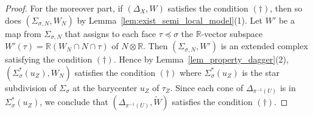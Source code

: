 \documentclass[12pt,reqno]{amsart}
\theoremstyle{definition}
\newcommand\bR{{\mathbb R}}
\begin{document}
\begin{proof}
For the moreover part, if $(\Delta_X,W)$ satisfies the condition $(\dagger)$, then so does $(\Sigma_{\sigma,N},W_N)$ by Lemma~\ref{lem:exist_semi_local_model}(1). 
Let $W'$ be a map from $\Sigma_{\sigma,N}$ that assigns to each face $\tau\preceq\sigma$ the $\bR$-vector subspace $W'(\tau)=\bR(W_N\cap N\cap \tau)$ of $N\otimes\bR$. 
Then $(\Sigma_{\sigma,N},W')$ is an extended complex satisfying the condition $(\dagger)$. 
Hence by Lemma~\ref{lem_property_dagger}(2), $(\Sigma_\sigma^*(u_Z),W_N)$ satisfies the condition $(\dagger)$ where $\Sigma_\sigma^*(u_Z)$ is the star subdivision of $\Sigma_\sigma$ at the barycenter $u_Z$ of $\tau_Z$. Since each cone of $\Delta_{\pi^{-1}(U)}$ is in $\Sigma_\sigma^*(u_Z)$, we conclude that $(\Delta_{\pi^{-1}(U)},\widetilde{W})$ satisfies the condition $(\dagger)$.
\end{proof}
\end{document}
